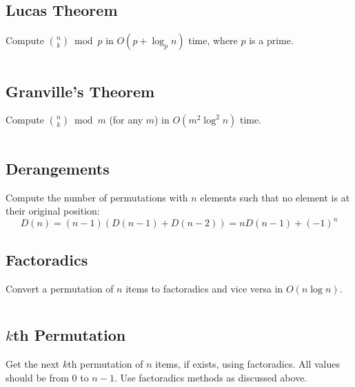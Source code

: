 \documentclass[8pt,a4paper,landscape,oneside]{amsart}
\newcommand{\code}[1]{\inputminted[fontsize=\normalsize,baselinestretch=1]{cpp}{_code/#1}}
\begin{document}
\begin{multicols*}{3}
  \subsection{Lucas Theorem}
    Compute $\binom{n}{k} \bmod{p}$ in $O(p + \log_p n)$ time, where $p$ is a prime.
    \code{combs/lucas.cpp}
  \subsection{Granville's Theorem}
    Compute $\binom{n}{k} \bmod{m}$ (for any $m$) in $O(m^2 \log^2 n)$ time.
    \code{combs/granville.py}
  \subsection{Derangements}
    Compute the number of permutations with $n$ elements such that no element is at their original position:
    \[
    D(n) = (n-1) \left( D(n-1) + D(n-2) \right) =  n D(n-1) + (-1)^n
    \]
    \subsection{Factoradics}
    Convert a permutation of $n$ items to factoradics and vice versa in $O(n \log n)$.
    \code{combs/factoradics.cpp}
  \subsection{$k$th Permutation}
    Get the next $k$th permutation of $n$ items, if exists, using factoradics. All values should be from $0$ to $n-1$. Use factoradics methods as discussed above.
    \code{combs/kth-permutation.cpp}

\end{multicols*}
\end{document}
